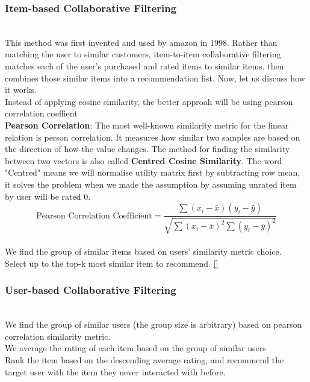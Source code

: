 \subsubsection{Item-based Collaborative Filtering}
\\This method was first invented and used by amazon in 1998. 
Rather than matching the user to similar customers, item-to-item collaborative filtering matches each of the user’s purchased and rated items to similar items, then combines those similar items into a recommendation list. Now, let us discuss how it works.
\\Instead of applying cosine similarity, the better approah will be using pearson correlation coeffient
\\\textbf{Pearson Correlation}: The most well-known similarity metric for the linear relation is person correlation. It measures how similar two samples are based on the direction of how the value changes. 
The method for finding the similarity between two vectors is also called \textbf{Centred Cosine Similarity}. The word "Centred" means we will normalise utility matrix first by subtracting row mean, it solves the problem when we made the assumption by assuming unrated item by user will be rated 0. 
\begin{equation*}
\text{Pearson Correlation Coefficient} = \frac{\sum(x_{i} - \bar{x})(y_{i} - \bar{y})} {\sqrt{\sum(x_{i} - \bar{x})^{2} \sum{(y_{i} - \bar{y})^{2} }}}
\end{equation*}
\\We find the group of similar items based on users' similarity metric choice.
\\Select up to the top-k most similar item to recommend. \autoref{}


\subsubsection{User-based Collaborative Filtering}
\\We find the group of similar users (the group size is arbitrary) based on pearson correlation similarity metric.
\\We average the rating of each item based on the group of similar users
\\Rank the item based on the descending average rating, and recommend the target user with the item they never interacted with before.


